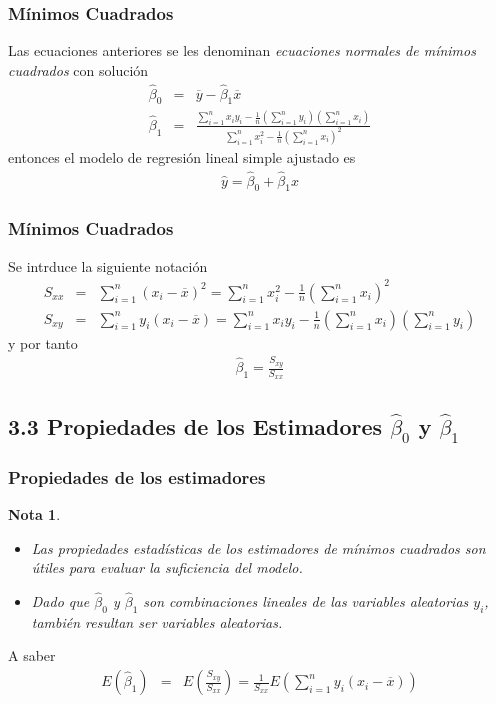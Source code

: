 \documentclass{beamer}
\newtheorem{Note}{Nota}[section]
\begin{document}
\begin{frame}\frametitle{M\'inimos Cuadrados}
Las ecuaciones anteriores se les denominan \textit{ecuaciones normales de m\'inimos cuadrados} con soluci\'on
\begin{eqnarray}\label{Ecs.Estimadores.Regresion}
\hat{\beta}_{0}&=&\overline{y}-\hat{\beta}_{1}\overline{x}\\
\hat{\beta}_{1}&=&\frac{\sum_{i=1}^{n}x_{i}y_{i}-\frac{1}{n}\left(\sum_{i=1}^{n}y_{i}\right)\left(\sum_{i=1}^{n}x_{i}\right)}{\sum_{i=1}^{n}x_{i}^{2}-\frac{1}{n}\left(\sum_{i=1}^{n}x_{i}\right)^{2}}
\end{eqnarray}
entonces el modelo de regresi\'on lineal simple ajustado es
\begin{eqnarray}
\hat{y}=\hat{\beta}_{0}+\hat{\beta}_{1}x
\end{eqnarray}
\end{frame}
\begin{frame}\frametitle{M\'inimos Cuadrados}
Se intrduce la siguiente notaci\'on
\begin{eqnarray}
S_{xx}&=&\sum_{i=1}^{n}\left(x_{i}-\overline{x}\right)^{2}=\sum_{i=1}^{n}x_{i}^{2}-\frac{1}{n}\left(\sum_{i=1}^{n}x_{i}\right)^{2}\\
S_{xy}&=&\sum_{i=1}^{n}y_{i}\left(x_{i}-\overline{x}\right)=\sum_{i=1}^{n}x_{i}y_{i}-\frac{1}{n}\left(\sum_{i=1}^{n}x_{i}\right)\left(\sum_{i=1}^{n}y_{i}\right)
\end{eqnarray}
y por tanto
\begin{eqnarray}
\hat{\beta}_{1}=\frac{S_{xy}}{S_{xx}}
\end{eqnarray}
\end{frame}
\subsection{3.3 Propiedades de los Estimadores $\hat{\beta}_{0}$ y $\hat{\beta}_{1}$}
\begin{frame}\frametitle{Propiedades de los estimadores}
\begin{Note}\pause
\begin{itemize}
\item Las propiedades estad\'isticas de los estimadores de m\'inimos cuadrados son \'utiles para evaluar la suficiencia del modelo.

\item Dado que $\hat{\beta}_{0}$ y  $\hat{\beta}_{1}$ son combinaciones lineales de las variables aleatorias $y_{i}$, tambi\'en resultan ser variables aleatorias.
\end{itemize}
\end{Note}
A saber
\begin{eqnarray*}
E\left(\hat{\beta}_{1}\right)&=&E\left(\frac{S_{xy}}{S_{xx}}\right)=\frac{1}{S_{xx}}E\left(\sum_{i=1}^{n}y_{i}\left(x_{i}-\overline{x}\right)\right)
\end{eqnarray*}
\end{frame}
\end{document}
